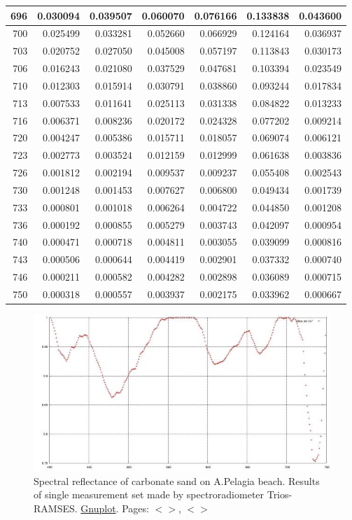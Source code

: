 \documentclass[11pt]{article}
\begin{document}
\begin{appendices}
\begin{longtable}{|r|r|r|r|r|r|r|}
	696 & 0.030094 & 0.039507 & 0.060070 & 0.076166 & 0.133838 & 0.043600 \\ \hline
	700 & 0.025499 & 0.033281 & 0.052660 & 0.066929 & 0.124164 & 0.036937 \\ \hline
	703 & 0.020752 & 0.027050 & 0.045008 & 0.057197 & 0.113843 & 0.030173 \\ \hline
	706 & 0.016243 & 0.021080 & 0.037529 & 0.047681 & 0.103394 & 0.023549 \\ \hline
	710 & 0.012303 & 0.015914 & 0.030791 & 0.038860 & 0.093244 & 0.017834 \\ \hline
	713 & 0.007533 & 0.011641 & 0.025113 & 0.031338 & 0.084822 & 0.013233 \\ \hline
	716 & 0.006371 & 0.008236 & 0.020172 & 0.024328 & 0.077202 & 0.009214 \\ \hline
	720 & 0.004247 & 0.005386 & 0.015711 & 0.018057 & 0.069074 & 0.006121 \\ \hline
	723 & 0.002773 & 0.003524 & 0.012159 & 0.012999 & 0.061638 & 0.003836 \\ \hline
	726 & 0.001812 & 0.002194 & 0.009537 & 0.009237 & 0.055408 & 0.002543 \\ \hline
	730 & 0.001248 & 0.001453 & 0.007627 & 0.006800 & 0.049434 & 0.001739 \\ \hline
	733 & 0.000801 & 0.001018 & 0.006264 & 0.004722 & 0.044850 & 0.001208 \\ \hline
	736 & 0.000192 & 0.000855 & 0.005279 & 0.003743 & 0.042097 & 0.000954 \\ \hline
	740 & 0.000471 & 0.000718 & 0.004811 & 0.003055 & 0.039099 & 0.000816 \\ \hline
	743 & 0.000506 & 0.000644 & 0.004419 & 0.002901 & 0.037332 & 0.000740 \\ \hline
	746 & 0.000211 & 0.000582 & 0.004282 & 0.002898 & 0.036089 & 0.000715 \\ \hline
	750 & 0.000318 & 0.000557 & 0.003937 & 0.002175 & 0.033962 & 0.000667 \\ \hline
\end{longtable}

\begin{figure}[H]
	\centering
	\includegraphics[scale=0.5]{Fig-26.jpg}
	\caption{Spectral reflectance of carbonate sand on A.Pelagia beach. Results of single measurement set made by spectroradiometer Trios-RAMSES. \href{http://www.gnuplot.info/}{Gnuplot}. Pages: $<$\pageref{page-28}$>$, $<$\pageref{page-39}$>$}
	\label{fig:A.35}
\end{figure}
\pagebreak
\newpage


\end{appendices}
\end{document}
